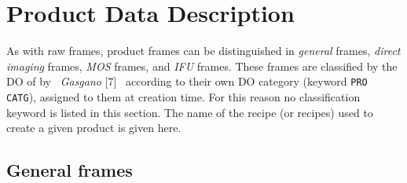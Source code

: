 \section{Product Data Description}
\label{DATA:PRODUCT}

As with raw frames, product frames can be distinguished in 
{\it general} frames, {\it direct imaging} frames, {\it MOS} frames,
and {\it IFU} frames. These frames are classified by the DO 
of by \ {\it Gasgano} [7] \ according to their own DO category 
(keyword {\tt PRO CATG}), 
assigned to them at creation time. For this reason no classification 
keyword is listed in this section. The name of the recipe
(or recipes) used to create a given product is given here.

\subsection{General frames}
\label{DATA:PRODGEN}

